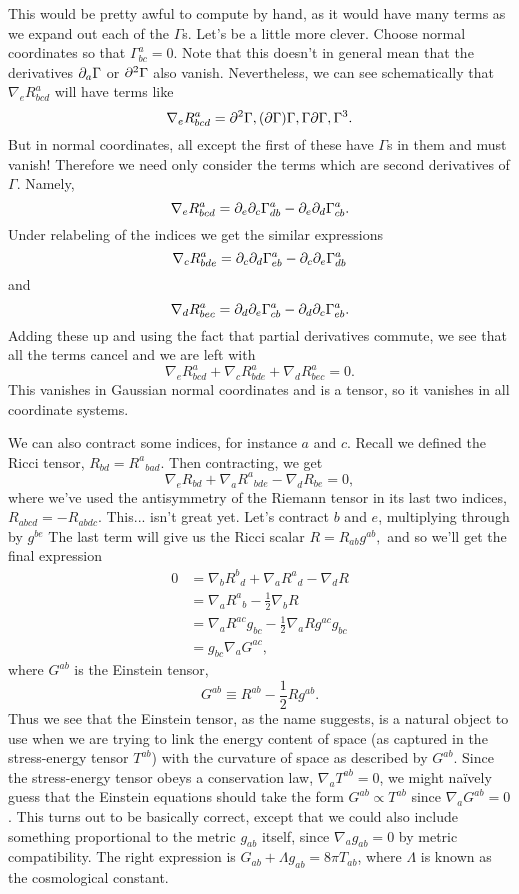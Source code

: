 This would be pretty awful to compute by hand, as it would have many terms as we expand out each of the $\Gamma$s. Let's be a little more clever. Choose normal coordinates so that $\Gamma^a_{bc}=0$. Note that this doesn't in general mean that the derivatives $\partial_a \Gamma$ or $\partial^2 \Gamma$ also vanish. Nevertheless, we can see schematically that $\nabla_e R^a_{bcd}$ will have terms like
$$\nabla_e R^a_{bcd}=\partial^2\Gamma,(\partial \Gamma)\Gamma, \Gamma \partial \Gamma, \Gamma^3.$$
But in normal coordinates, all except the first of these have $\Gamma$s in them and must vanish! Therefore we need only consider the terms which are second derivatives of $\Gamma.$ Namely,
$$\nabla_e R^a_{bcd}=\partial_e \partial_c \Gamma^a_{db}-\partial_e \partial_d \Gamma^a_{cb}.$$
Under relabeling of the indices we get the similar expressions
$$\nabla_c R^a_{bde}=\partial_c \partial_d \Gamma^a_{eb}-\partial_c \partial_e \Gamma^a_{db}$$
and
$$\nabla_d R^a_{bec}=\partial_d \partial_e \Gamma^a_{cb}-\partial_d \partial_c \Gamma^a_{eb}.$$
Adding these up and using the fact that partial derivatives commute, we see that all the terms cancel and we are left with
$$\nabla_e R^a_{bcd}+\nabla_c R^a_{bde}+\nabla_d R^a_{bec}=0.$$
This vanishes in Gaussian normal coordinates and is a tensor, so it vanishes in all coordinate systems.

We can also contract some indices, for instance $a$ and $c$. Recall we defined the Ricci tensor, $R_{bd}=R^a{}_{bad}$. Then contracting, we get
$$\nabla_e R_{bd}+\nabla_a R^a{}_{bde}-\nabla_d R_{be}=0,$$
where we've used the antisymmetry of the Riemann tensor in its last two indices, $R_{abcd}=-R_{abdc}.$ This... isn't great yet. Let's contract $b$ and $e$, multiplying through by $g^{be}$ The last term will give us the Ricci scalar $R=R_{ab}g^{ab},$ and so we'll get the final expression
\begin{align*}
0&=\nabla_b R^b{}_d +\nabla_a R^a{}_d -\nabla_d R\\
&=\nabla_a R^a{}_b -\frac{1}{2}\nabla_b R\\
&=\nabla_a R^{ac} g_{bc} -\frac{1}{2}\nabla_a R g^{ac} g_{bc}\\
&= g_{bc} \nabla_a G^{ac},
\end{align*}
where $G^{ab}$ is the Einstein tensor,
$$G^{ab}\equiv R^{ab}-\frac{1}{2}Rg^{ab}.$$
Thus we see that the Einstein tensor, as the name suggests, is a natural object to use when we are trying to link the energy content of space (as captured in the stress-energy tensor $T^{ab}$) with the curvature of space as described by $G^{ab}$. Since the stress-energy tensor obeys a conservation law, $\nabla_a T^{ab}=0$, we might na\"ively guess that the Einstein equations should take the form $G^{ab}\propto T^{ab}$ since $\nabla_a G^{ab}=0$. This turns out to be basically correct, except that we could also include something proportional to the metric $g_{ab}$ itself, since $\nabla_a g_{ab}=0$ by metric compatibility. The right expression is $G_{ab}+\Lambda g_{ab}= 8\pi T_{ab}$, where $\Lambda$ is known as the cosmological constant.

